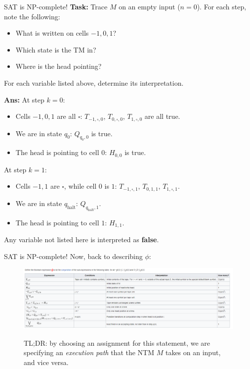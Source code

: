 \documentclass{beamer}
\begin{document}
\begin{frame}{SAT is NP-complete!}
\textbf{Task:} Trace $M$ on an empty input ($n = 0$). For each step, note the following:
\begin{itemize}
    \item What is written on cells $-1, 0, 1$?
    \item Which state is the TM in?
    \item Where is the head pointing?
\end{itemize}
For each variable listed above, determine its interpretation.

\textbf{Ans:} At step $k = 0$:
\begin{itemize}
    \item Cells $-1, 0, 1$ are all $\square$: $T_{-1, \square, 0}$, $T_{0, \square, 0}$, $T_{1, \square, 0}$ are all true.
    \item We are in state $q_0$: $Q_{q_0, 0}$ is true.
    \item The head is pointing to cell $0$: $H_{0, 0}$ is true.
\end{itemize}

\pause

At step $k = 1$:
\begin{itemize}
    \item Cells $-1, 1$ are $\square$, while cell $0$ is $1$: $T_{-1, \square, 1}$, $T_{0, 1, 1}$, $T_{1, \square, 1}$.
    \item We are in state $q_\text{halt}$: $Q_{q_\text{halt}, 1}$.
    \item The head is pointing to cell $1$: $H_{1, 1}$.
\end{itemize}

Any variable not listed here is interpreted as \textbf{false}.

\end{frame}

\begin{frame}{SAT is NP-complete!}
Now, back to describing $\phi$:
\begin{figure}[h]
    \centering
    \includegraphics[width=12cm]{img/cook-levin-statement.png}
    
    TL;DR: by choosing an assignment for this statement, we are specifying an \textit{execution path} that the NTM $M$ takes on an input, and vice versa.
\end{figure}


\end{frame}
\end{document}
